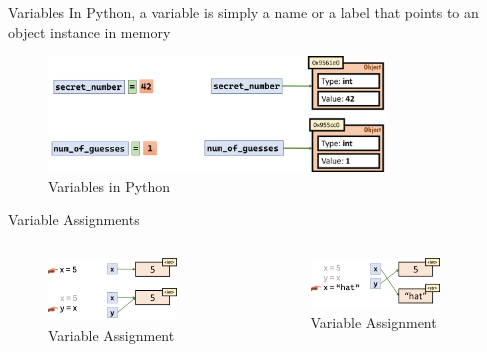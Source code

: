 \begin{frame}{Variables}
    In Python, a variable is simply a name or a label that points to an object instance in memory
    \begin{figure}
        \centering
        \includegraphics[width=0.8\textwidth]{pics/variable.png}
        \caption{Variables in Python}
    \end{figure}
\end{frame}

\begin{frame}{Variable Assignments}
    \begin{columns}
        \begin{figure}
            \centering
            \includegraphics[width=0.8\textwidth]{pics/assignment.png}
            \caption{Variable Assignment}
        \end{figure}
        \begin{figure}
            \centering
            \includegraphics[width=0.8\textwidth]{pics/assignment2.png}
            \caption{Variable Assignment}
        \end{figure}
    \end{columns}
    
\end{frame}

